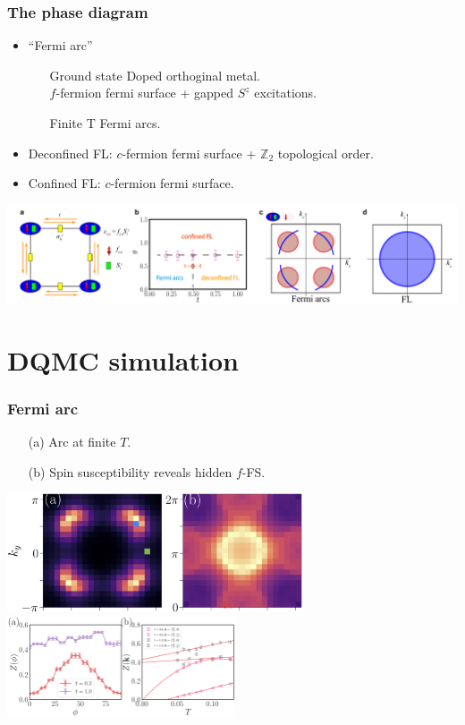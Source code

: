 \documentclass[xcolor=table, 10pt, aspectratio=1610]{beamer}
\begin{document}
\begin{frame}
	\frametitle{The phase diagram}
	\begin{itemize}
		\item ``Fermi arc''
		\begin{itemize}
			\item[Ground state] Doped orthoginal metal.\\
			$f$-fermion fermi surface + gapped $S^z$ excitations.
			\item[Finite T] Fermi arcs.
		\end{itemize}
		\item Deconfined FL: $c$-fermion fermi surface + $\mathbb Z_2$ topological order.
		\item Confined FL: $c$-fermion fermi surface.
	\end{itemize}
	\includegraphics[width=\textwidth]{doped_pd}
\end{frame}

\section{DQMC simulation}

\begin{frame}
	\frametitle{Fermi arc}
	\begin{itemize}
		\item[(a)] Arc at finite $T$.
		\item[(b)] Spin susceptibility reveals hidden $f$-FS.
	\end{itemize}
	\begin{center}
		\includegraphics[height=3.5cm]{fermi_arc}\\
		\includegraphics[height=3cm]{arc_T}
	\end{center}
\end{frame}
\end{document}
